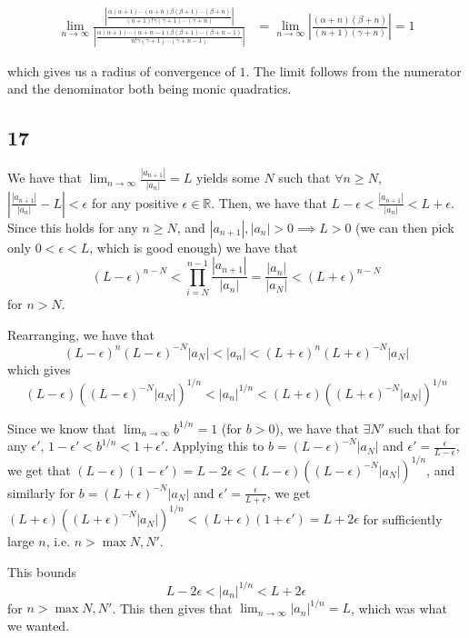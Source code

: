\documentclass[12pt,letterpaper]{article}
\theoremstyle{definition}
\newcommand{\R}{\mathbb{R}}
\begin{document}
\begin{align*}
  \lim_{n \rightarrow \infty} \frac{\left|\frac{\alpha(\alpha+1)\cdots(\alpha+n)\beta(\beta+1)\cdots(\beta+n)}{(n+1)!\gamma(\gamma+1)\cdots(\gamma+n)}\right|}{\left| \frac{\alpha(\alpha+1)\cdots(\alpha+n-1)\beta(\beta+1)\cdots(\beta+n-1)}{n!\gamma(\gamma+1)\cdots(\gamma+n-1)}\right|} &= \lim_{n \rightarrow \infty} \left| \frac{(\alpha + n)(\beta + n)}{(n+1)(\gamma+n)}\right| = 1
\end{align*}

which gives us a radius of convergence of $1$. The limit follows from the numerator and the denominator both being monic quadratics.

\subsection*{17}

We have that $\lim_{n \rightarrow \infty} \frac{|a_{n+1}|}{|a_n|} = L$ yields some $N$ such that $\forall n \geq N$, $\left|\frac{|a_{n+1}|}{|a_n|} - L\right| < \epsilon$ for any positive $\epsilon \in \R$. Then, we have that $L - \epsilon < \frac{|a_{n+1}|}{|a_n|} < L + \epsilon$. Since this holds for any $n \geq N$, and $|a_{n+1}|, |a_n| > 0 \implies L > 0$ (we can then pick only $0 < \epsilon < L$, which is good enough) we have that 
\[
  (L - \epsilon)^{n-N} < \prod_{i=N}^{n-1}\frac{|a_{n+1}|}{|a_n|} = \frac{|a_n|}{|a_N|} < (L + \epsilon)^{n-N}
\]
for $n > N$.

Rearranging, we have that 
\[
  (L - \epsilon)^n(L - \epsilon)^{-N}|a_N| < |a_n| < (L + \epsilon)^{n}(L+\epsilon)^{-N}|a_N|
\]
which gives
\[
  (L - \epsilon)((L - \epsilon)^{-N}|a_N|)^{1 / n} < |a_n|^{1 / n} < (L + \epsilon)((L+\epsilon)^{-N}|a_N|)^{1 / n}
\]

Since we know that $\lim_{n \rightarrow \infty}b^{1 / n} = 1$ (for $b  > 0$), we have that $\exists N'$ such that for any $\epsilon'$, $1 - \epsilon' < b^{1 / n} < 1 + \epsilon'$. Applying this to $b = (L - \epsilon)^{-N}|a_N|$ and $\epsilon' = \frac{\epsilon}{L - \epsilon}$, we get that $(L - \epsilon)(1 - \epsilon') =  L - 2\epsilon < (L - \epsilon)((L - \epsilon)^{-N}|a_N|)^{1 / n}$, and similarly for $b = (L + \epsilon)^{-N}|a_N|$ and $\epsilon' = \frac{\epsilon}{L + \epsilon}$, we get $(L + \epsilon)((L + \epsilon)^{-N}|a_N|)^{1 / n} < (L + \epsilon)(1 + \epsilon') =  L + 2\epsilon$ for sufficiently large $n$, i.e. $n > \max{N, N'}$. 

This bounds
\[
  L - 2\epsilon < |a_n|^{1 / n} < L + 2\epsilon
\]
for $n > \max{N, N'}$. This then gives that $\lim_{n \rightarrow \infty} |a_n|^{1 / n} = L$, which was what we wanted.
\end{document}
